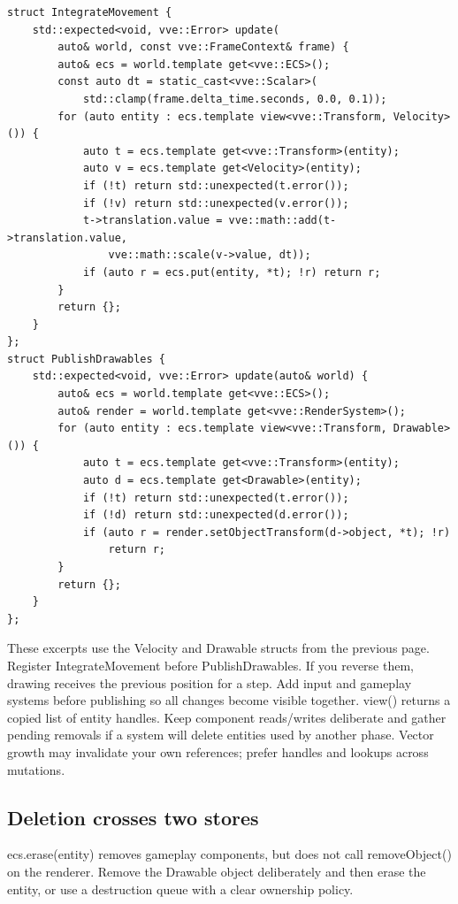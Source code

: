 \documentclass[11pt,a4paper]{article}
\begin{document}
\begin{lstlisting}[language={}]
struct IntegrateMovement {
    std::expected<void, vve::Error> update(
        auto& world, const vve::FrameContext& frame) {
        auto& ecs = world.template get<vve::ECS>();
        const auto dt = static_cast<vve::Scalar>(
            std::clamp(frame.delta_time.seconds, 0.0, 0.1));
        for (auto entity : ecs.template view<vve::Transform, Velocity>()) {
            auto t = ecs.template get<vve::Transform>(entity);
            auto v = ecs.template get<Velocity>(entity);
            if (!t) return std::unexpected(t.error());
            if (!v) return std::unexpected(v.error());
            t->translation.value = vve::math::add(t->translation.value,
                vve::math::scale(v->value, dt));
            if (auto r = ecs.put(entity, *t); !r) return r;
        }
        return {};
    }
};
struct PublishDrawables {
    std::expected<void, vve::Error> update(auto& world) {
        auto& ecs = world.template get<vve::ECS>();
        auto& render = world.template get<vve::RenderSystem>();
        for (auto entity : ecs.template view<vve::Transform, Drawable>()) {
            auto t = ecs.template get<vve::Transform>(entity);
            auto d = ecs.template get<Drawable>(entity);
            if (!t) return std::unexpected(t.error());
            if (!d) return std::unexpected(d.error());
            if (auto r = render.setObjectTransform(d->object, *t); !r)
                return r;
        }
        return {};
    }
};
\end{lstlisting}

These excerpts use the Velocity and Drawable structs from the previous page. Register IntegrateMovement before PublishDrawables. If you reverse them, drawing receives the previous position for a step. Add input and gameplay systems before publishing so all changes become visible together. view() returns a copied list of entity handles. Keep component reads/writes deliberate and gather pending removals if a system will delete entities used by another phase. Vector growth may invalidate your own references; prefer handles and lookups across mutations.

\subsection*{Deletion crosses two stores}
ecs.erase(entity) removes gameplay components, but does not call removeObject() on the renderer. Remove the Drawable object deliberately and then erase the entity, or use a destruction queue with a clear ownership policy.
\end{document}
